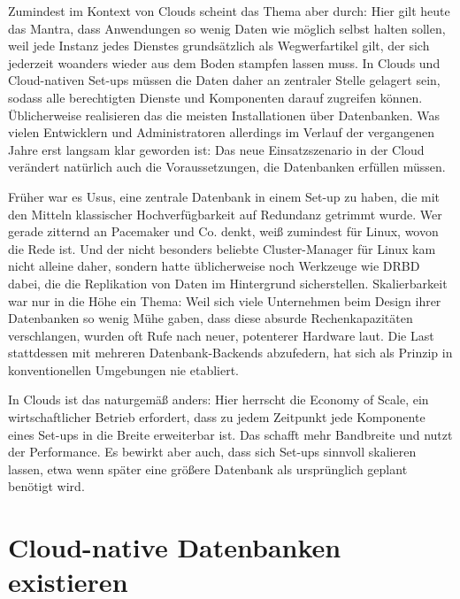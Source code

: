 Zumindest im Kontext von Clouds scheint das Thema aber durch: Hier gilt heute das Mantra, dass Anwendungen so wenig Daten wie möglich selbst halten sollen, weil jede Instanz jedes Dienstes grundsätzlich als Wegwerfartikel gilt, der sich jederzeit woanders wieder aus dem Boden stampfen lassen muss. In Clouds und Cloud-nativen Set-ups müssen die Daten daher an zentraler Stelle gelagert sein, sodass alle berechtigten Dienste und Komponenten darauf zugreifen können. Üblicherweise realisieren das die meisten Installationen über Datenbanken. Was vielen Entwicklern und Administratoren allerdings im Verlauf der vergangenen Jahre erst langsam klar geworden ist: Das neue Einsatzszenario in der Cloud verändert natürlich auch die Voraussetzungen, die Datenbanken erfüllen müssen.

Früher war es Usus, eine zentrale Datenbank in einem Set-up zu haben, die mit den Mitteln klassischer Hochverfügbarkeit auf Redundanz getrimmt wurde. Wer gerade zitternd an Pacemaker und Co. denkt, weiß zumindest für Linux, wovon die Rede ist. Und der nicht besonders beliebte Cluster-Manager für Linux kam nicht alleine daher, sondern hatte üblicherweise noch Werkzeuge wie DRBD dabei, die die Replikation von Daten im Hintergrund sicherstellen. Skalierbarkeit war nur in die Höhe ein Thema: Weil sich viele Unternehmen beim Design ihrer Datenbanken so wenig Mühe gaben, dass diese absurde Rechenkapazitäten verschlangen, wurden oft Rufe nach neuer, potenterer Hardware laut. Die Last stattdessen mit mehreren Datenbank-Backends abzufedern, hat sich als Prinzip in konventionellen Umgebungen nie etabliert.

In Clouds ist das naturgemäß anders: Hier herrscht die Economy of Scale, ein wirtschaftlicher Betrieb erfordert, dass zu jedem Zeitpunkt jede Komponente eines Set-ups in die Breite erweiterbar ist. Das schafft mehr Bandbreite und nutzt der Performance. Es bewirkt aber auch, dass sich Set-ups sinnvoll skalieren lassen, etwa wenn später eine größere Datenbank als ursprünglich geplant benötigt wird.

\section{Cloud-native Datenbanken existieren}

